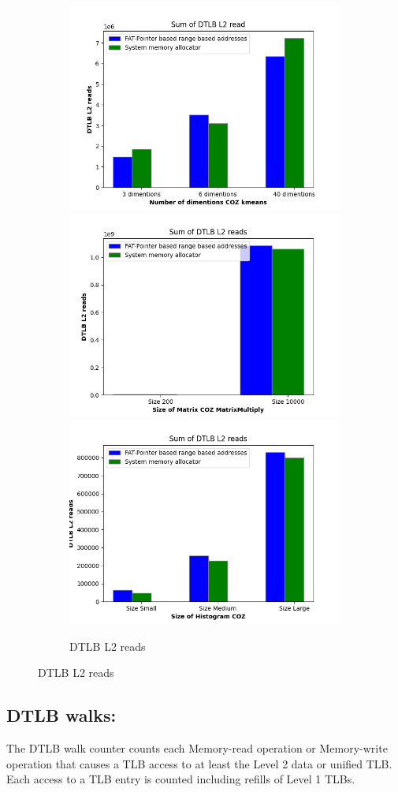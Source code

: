 \begin{figure}
  \begin{subfigure}{\linewidth}
    \includegraphics[width=.5\linewidth]{l2-tlb-kmeans.png}\hfill
    \includegraphics[width=.5\linewidth]{l2-tlb-matrixmultiply.png}\hfill
    \includegraphics[width=.5\linewidth]{l2-tlb-histogram.png}
  \caption{DTLB L2 reads}
\end{subfigure}
\end{figure}


\subsection{DTLB walks:}
The DTLB walk counter counts each Memory-read operation or Memory-write operation that causes a 
TLB access to at least the Level 2 data or unified TLB.
Each access to a TLB entry is counted including refills 
of Level 1 TLBs.

